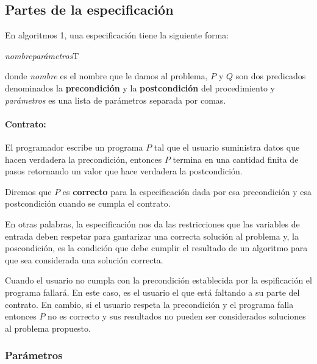 \subsection{Partes de la especificación}
En algoritmos 1, una especificación tiene la siguiente forma:
\begin{center}
     \begin{minipage}[]{0.8\textwidth}
     \begin{proc}{\textit{nombre}}{\textit{parámetros}}{T}
	\end{proc}
  \end{minipage}
\end{center}

donde \textit{nombre} es el nombre que le damos al problema,  $P$ y $Q$ son dos predicados denominados la \textbf{precondición} y la \textbf{postcondición} del procedimiento y \textit{parámetros} es una lista de parámetros separada por comas.

\paragraph{Contrato:} El programador escribe un programa $P$ tal que el usuario suministra datos que hacen verdadera la precondición, entonces $P$ termina en una cantidad finita de pasos retornando un valor que hace verdadera la postcondición.

\vspace*{5mm}
Diremos que $P$ es \textbf{correcto} para la especificación dada por esa precondición y esa postcondición cuando se cumpla el contrato. 

En otras palabras, la especificación nos da las restricciones que las variables de entrada deben respetar para gantarizar una correcta solución al problema y, la poscondición, es la condición que debe cumplir el resultado de un algoritmo para que sea considerada una solución correcta.
 
Cuando el usuario no cumpla con la precondición establecida por la espificación el programa fallará. En este caso, es el usuario el que está faltando a su parte del contrato. En cambio, si el usuario respeta la precondición y el programa falla entonces $P$ no es correcto y sus resultados no pueden ser considerados soluciones al problema propuesto.

\subsubsection{Parámetros}

